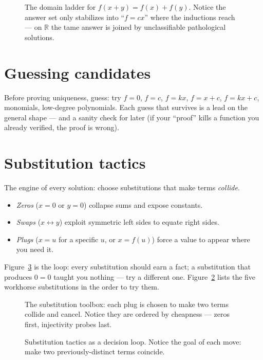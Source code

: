 \begin{figure}[ht]\centering

\caption{The domain ladder for $f(x+y)=f(x)+f(y)$. Notice the answer
set only stabilizes into ``$f=cx$'' where the inductions reach --- on
$\mathbb R$ the tame answer is joined by unclassifiable pathological
solutions.}
\label{fig:fedom}
\end{figure}

\section{Guessing candidates}
Before proving uniqueness, guess: try $f=0$, $f=c$, $f=kx$, $f=x+c$,
$f=kx+c$, monomials, low-degree polynomials. Each guess that survives is
a lead on the general shape --- and a sanity check for later (if your
``proof'' kills a function you already verified, the proof is wrong).

\section{Substitution tactics}
The engine of every solution: choose substitutions that make terms
\emph{collide}.
\begin{itemize}
\item \emph{Zeros} ($x=0$ or $y=0$) collapse sums and expose constants.
\item \emph{Swaps} ($x\leftrightarrow y$) exploit symmetric left sides to
equate right sides.
\item \emph{Plugs} ($x=u$ for a specific $u$, or $x=f(u)$) force a value
to appear where you need it.
\end{itemize}
Figure~\ref{fig:feflow} is the loop: every substitution should earn a
fact; a substitution that produces $0=0$ taught you nothing --- try a
different one. Figure~\ref{fig:subst} lists the five workhorse
substitutions in the order to try them.
\begin{figure}[ht]\centering

\caption{The substitution toolbox: each plug is chosen to make two
terms collide and cancel. Notice they are ordered by cheapness ---
zeros first, injectivity probes last.}
\label{fig:subst}
\end{figure}
\begin{figure}[ht]\centering

\caption{Substitution tactics as a decision loop. Notice the goal of
each move: make two previously-distinct terms coincide.}
\label{fig:feflow}
\end{figure}

